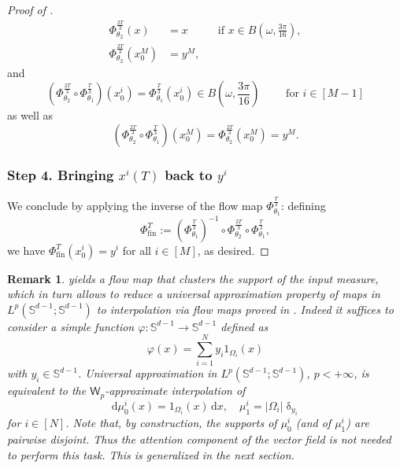 \documentclass[a4paper,11pt]{article}
\theoremstyle{plain}
\newtheorem{remark}[theorem]{Remark}
\newcommand{\diff}{\, \mathrm{d}}
\renewcommand{\S}{\mathbb{S}^{d-1}}
\numberwithin{equation}{section}
\begin{document}
\begin{proof}[Proof of ]
\begin{align*}
\Phi^{\frac{2T}{3}}_{\theta_2}(x)&=x\hspace{1cm}\text{ if }x\in B\left(\omega, \frac{3\pi}{16}\right),\\
\Phi^{\frac{2T}{3}}_{\theta_2}(x_0^M)&=y^M,
\end{align*}
and
\begin{equation*}
    \left(\Phi_{\theta_2}^{\frac{2T}{3}}\circ\Phi_{\theta_1}^{\frac{T}{3}}\right)(x_0^i)= \Phi_{\theta_1}^{\frac{T}{3}}(x_0^i)\in B\left(\omega, \frac{3\pi}{16}\right)\qquad\text{ for } i\in[M-1]
\end{equation*}
as well as
\begin{equation*}
    \left(\Phi_{\theta_2}^{\frac{2T}{3}}\circ\Phi_{\theta_1}^{\frac{T}{3}}\right)(x_0^M)= \Phi_{\theta_2}^{\frac{2T}{3}}(x_0^M)=y^M.
\end{equation*}


\subsubsection*{Step 4. Bringing $x^i(T)$ back to $y^i$}
We conclude by applying the inverse of the flow map $\Phi^{\frac{T}{3}}_{\theta_1}$: defining
\begin{equation*}
    \Phi^T_{\text{fin}}:=\left(\Phi^{\frac{T}{3}}_{\theta_1}\right)^{-1}\circ \Phi^{\frac{2T}{3}}_{\theta_2} \circ\Phi^{\frac{T}{3}}_{\theta_1},
\end{equation*}
we have $\Phi^T_{\text{fin}}(x_0^i)=y^i$ for all $i\in[M]$, as desired.
\end{proof}


\begin{remark}
 yields a flow map that clusters the support of the input measure, which in turn allows to reduce a universal approximation property of maps in $L^p(\S;\S)$ to interpolation via flow maps  proved in . 
Indeed it suffices to consider a simple function $\varphi:\S\to\S$ defined as
\begin{equation*}
\varphi(x)=\sum_{i=1}^N y_i1_{\Omega_i}(x)
\end{equation*}
with $y_i\in \S$. Universal approximation in $L^p(\S;\S)$, $p<+\infty$, is equivalent to the $\mathsf{W}_p$-approximate interpolation of
\begin{equation*}
\diff\mu_0^i(x)=1 _{\Omega_i}(x)\diff x,\quad
\mu_1^i=|\Omega_i|\updelta_{y_i}
\end{equation*}
for $i\in[N]$. Note that, by construction, the supports of $\mu_0^i$ (and of $\mu_1^i$) are pairwise disjoint. Thus the attention component of the vector field is not needed to perform this task. This is generalized in the next section.
\end{remark}
\end{document}
